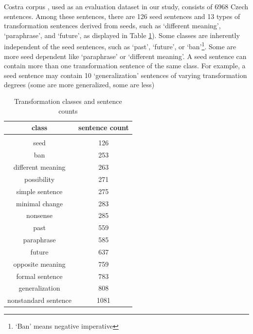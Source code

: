 \documentclass[11pt]{article}
\begin{document}
Costra corpus \cite{baranvcikova2020costra}, used as an evaluation dataset in our study, consists of 6968 Czech sentences. Among these sentences, there are 126 seed sentences and 13 types of transformation sentences derived from seeds, such as `different meaning', `paraphrase', and `future', as displayed in Table \ref{costra}). Some classes are inherently independent of the seed sentences, such as `past', `future', or `ban'\footnote{`Ban' means negative imperative}. Some are more seed dependent like `paraphrase' or `different meaning'. A seed sentence can contain more than one transformation sentence of the same class. For example, a seed sentence may contain 10 `generalization' sentences of varying transformation degrees (some are more generalized, some are less)


\begin{table}[!htp]
\centering
\begin{tabular}{ c c }
\toprule
\vspace{0.1cm}
\textbf{class}&\textbf{sentence count} \vspace{0.15cm}\\ 
 \hline \\[-1.7ex]


\vspace{0.1cm}seed & 126\\
\vspace{0.1cm}ban & 253\\
\vspace{0.1cm}different meaning & 263\\
\vspace{0.1cm}possibility & 271\\
\vspace{0.1cm}simple sentence & 275\\
\vspace{0.1cm}minimal change & 283\\
\vspace{0.1cm}nonsense & 285\\
\vspace{0.1cm}past & 559\\
\vspace{0.1cm}paraphrase & 585\\
\vspace{0.1cm}future & 637\\
\vspace{0.1cm}opposite meaning & 759\\
\vspace{0.1cm}formal sentence & 783\\
\vspace{0.1cm}generalization & 808\\
\vspace{0.1cm}nonstandard sentence & 1081\\
\toprule
\end{tabular}
\caption{Transformation classes and sentence counts}
\label{costra}
\end{table}
\end{document}
